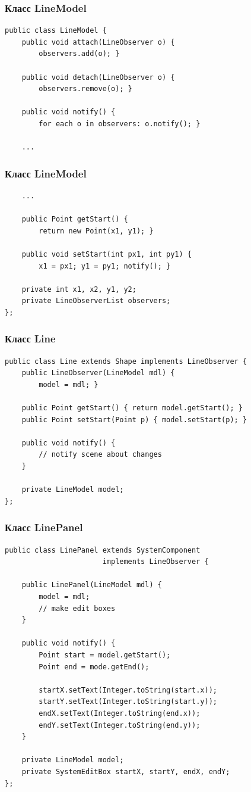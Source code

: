 \documentclass[handout]{beamer}
\begin{document}
\begin{frame}[fragile]
\frametitle{Класс LineModel}
\begin{lstlisting}
public class LineModel {
    public void attach(LineObserver o) {
        observers.add(o); }
    	
    public void detach(LineObserver o) {
        observers.remove(o); }
        
    public void notify() {
    	for each o in observers: o.notify(); }
    	
    ...
\end{lstlisting}
\end{frame}


\begin{frame}[fragile]
\frametitle{Класс LineModel}
\begin{lstlisting}
    ...
    
    public Point getStart() {
        return new Point(x1, y1); }
        
    public void setStart(int px1, int py1) {
        x1 = px1; y1 = py1; notify(); }
        
    private int x1, x2, y1, y2;
    private LineObserverList observers;
};
\end{lstlisting}
\end{frame}


\begin{frame}[fragile]
\frametitle{Класс Line}
\begin{lstlisting}
public class Line extends Shape implements LineObserver {
    public LineObserver(LineModel mdl) {
        model = mdl; }
        
    public Point getStart() { return model.getStart(); }
    public Point setStart(Point p) { model.setStart(p); }
    
    public void notify() {
        // notify scene about changes
    }
    
    private LineModel model;
};
\end{lstlisting}
\end{frame}


\begin{frame}[fragile]
\frametitle{Класс LinePanel}
\begin{lstlisting}
public class LinePanel extends SystemComponent
                       implements LineObserver {
		
    public LinePanel(LineModel mdl) {
        model = mdl;
        // make edit boxes
    }
        
    public void notify() {
        Point start = model.getStart();
        Point end = mode.getEnd();
        
        startX.setText(Integer.toString(start.x));
        startY.setText(Integer.toString(start.y));
        endX.setText(Integer.toString(end.x));
        endY.setText(Integer.toString(end.y));
    }
    
    private LineModel model;
    private SystemEditBox startX, startY, endX, endY;
};
\end{lstlisting}
\end{frame}
\end{document}
